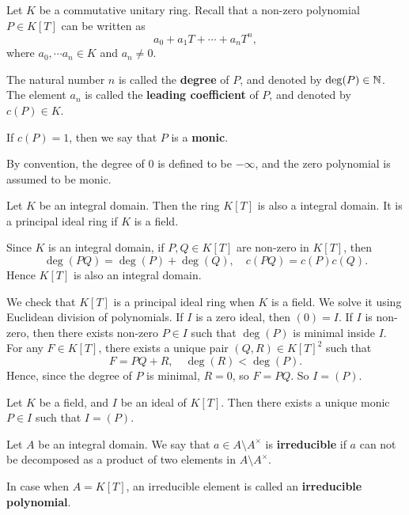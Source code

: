 \begin{definitionenv}
    Let $K$ be a commutative unitary ring.
    Recall that a non-zero polynomial $P \in K[T]$ can be written as
    $$a_0 + a_1 T +\cdots + a_n T^n,$$
    where $a_0,\cdots a_n \in K$ and $a_n \neq 0$.
    
    \quad The natural number $n$ is called the \textbf{degree} of $P$, and denoted by $\deg (P) \in \mathbb{N}$.
    The element $a_n$ is called the \textbf{leading coefficient} of $P$, and denoted by $c(P) \in K$.

    \quad If $c(P) = 1$, then we say that $P$ is a \textbf{monic}.

    \quad By convention, the degree of $0$ is defined to be $-\infty$,
    and the zero polynomial is assumed to be monic.
\end{definitionenv}

\begin{propositionenv}
    Let $K$ be an integral domain.
    Then the ring $K[T]$ is also a integral domain.
    It is a principal ideal ring if $K$ is a field.
\end{propositionenv}
\begin{proofenv}
    Since $K$ is an integral domain, if $P,Q \in K[T]$ are non-zero in $K[T]$, then
    $$\deg (PQ) = \deg (P) + \deg (Q),\quad c(PQ) = c(P)c(Q).$$
    Hence $K[T]$ is also an integral domain.

    \quad We check that $K[T]$ is a principal ideal ring when $K$ is a field.
    We solve it using Euclidean division of polynomials.
    If $I$ is a zero ideal, then $(0) = I$.
    If $I$  is non-zero, then there exists non-zero $P \in I$ such that $\deg(P)$ is minimal inside $I$.
    For any $F \in K[T]$, there exists a unique pair $(Q,R) \in K[T]^2$ such that 
    $$F = PQ + R, \quad \deg(R) < \deg(P).$$
    Hence, since the degree of $P$ is minimal, $R = 0$, so $F = PQ$.
    So $I = (P)$.
\end{proofenv}

\begin{remark}
    Let $K$ be a field,
    and $I$ be an ideal of $K[T]$.
    Then there exists a unique monic $P \in I$ such that $I = (P)$.
\end{remark}

\begin{definitionenv}
    Let $A$ be an integral domain.
    We say that $a \in A\setminus A^\times$ is \textbf{irreducible} if $a$ can not be decomposed as a product of two elements in $A\setminus A^\times$.

    \quad In case when $A = K[T]$,
    an irreducible element is called an \textbf{irreducible polynomial}.
\end{definitionenv}

